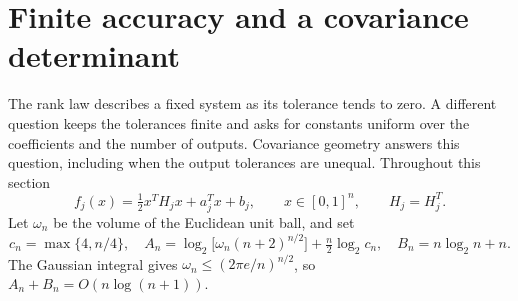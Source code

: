 \section{Finite accuracy and a covariance determinant}\label{sec:finite-quadratic}

The rank law describes a fixed system as its tolerance tends to zero.
A different question keeps the tolerances finite and asks for constants
uniform over the coefficients and the number of outputs. Covariance
geometry answers this question, including when the output tolerances
are unequal. Throughout this section
\[
 f_j(x)=\tfrac12x^TH_jx+a_j^Tx+b_j,\qquad x\in[0,1]^n,
 \qquad H_j=H_j^T.
\]
Let $\omega_n$ be the volume of the Euclidean unit ball, and set
\begin{equation}\label{eq:finite-constants}
 c_n=\max\{4,n/4\},\quad
 A_n=\log_2\!\bigl[\omega_n(n+2)^{n/2}\bigr]
                   +\tfrac n2\log_2c_n,\quad
 B_n=n\log_2 n+n.
\end{equation}
The Gaussian integral gives
$\omega_n\le(2\pi e/n)^{n/2}$, so $A_n+B_n=O(n\log(n+1))$.


